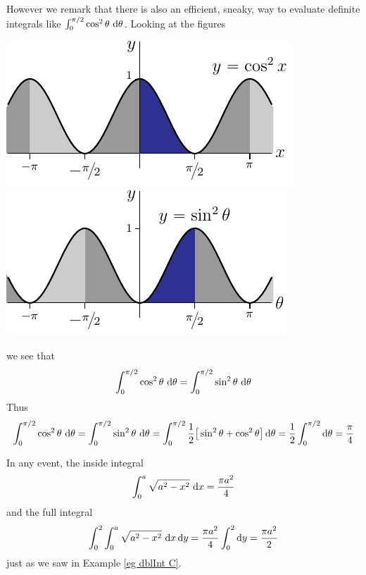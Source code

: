 \begin{eg}
However we remark that there is also an efficient, sneaky, way to evaluate
definite integrals like $\int_0^{\pi/2} \cos^2\theta\ \mathrm{d}\theta$.
Looking at the figures 
\begin{mfig}
\begin{center}
    \includegraphics{cos2Agraph.pdf}\qquad
    \includegraphics{sin2Agraph.pdf}
\end{center}
\end{mfig}
we see that 
\begin{equation*}
\int_0^{\pi/2} \cos^2\theta\ \dee{\theta}
=\int_0^{\pi/2} \sin^2\theta\ \dee{\theta}
\end{equation*}
Thus
\begin{align*}
\int_0^{\pi/2} \cos^2\theta\ \mathrm{d}\theta
=\int_0^{\pi/2} \sin^2\theta\ \mathrm{d}\theta
=\int_0^{\pi/2} \frac{1}{2}\big[\sin^2\theta+\cos^2\theta\big]\,\mathrm{d}\theta
=\frac{1}{2}\int_0^{\pi/2} \mathrm{d}\theta
=\frac{\pi}{4}
\end{align*}

In any event, the inside integral 
\begin{equation*}
\int_0^a \sqrt{a^2-x^2}\ \mathrm{d}x
=\frac{\pi a^2}{4}
\end{equation*}
and the full integral
\begin{equation*}
\int_0^2\int_0^a \sqrt{a^2-x^2}\ \mathrm{d}x\,\mathrm{d}y
=\frac{\pi a^2}{4}\int_0^2\mathrm{d}y
=\frac{\pi a^2}{2}
\end{equation*}
just as we saw in Example \ref{eg dblInt C}.
\end{eg}




